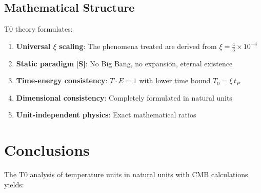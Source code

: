 	\subsection{Mathematical Structure}
	
	T0 theory formulates:
	\begin{enumerate}
		\item \textbf{Universal $\xi$ scaling}: The phenomena treated are derived from $\xi = \frac{4}{3} \times 10^{-4}$
		\item \textbf{Static paradigm} \textbf{[S]}: No Big Bang, no expansion, eternal existence
		\item \textbf{Time-energy consistency}: $T\cdot E = 1$ with lower time bound $T_0 = \xi\,t_P$
		\item \textbf{Dimensional consistency}: Completely formulated in natural units
		\item \textbf{Unit-independent physics}: Exact mathematical ratios
	\end{enumerate}
	
	\section{Conclusions}
	
	The T0 analysis of temperature units in natural units with CMB calculations yields:
	
